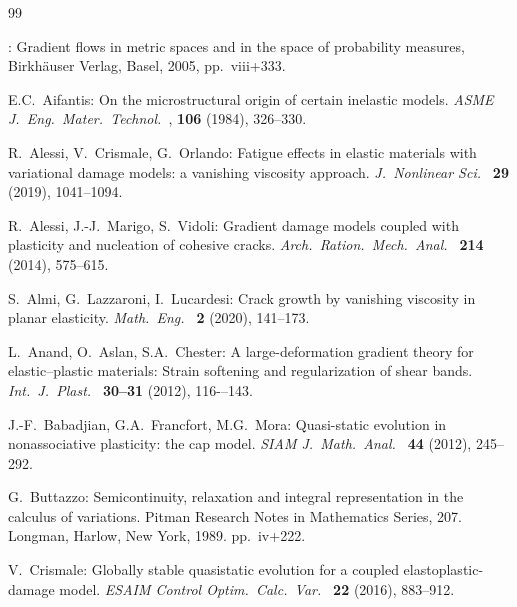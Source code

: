 \documentclass[reqno]{amsart}
\theoremstyle{definition}
\numberwithin{equation}{section}
\begin{document}
\begin{thebibliography}{99}

:
\newblock Gradient flows in metric spaces and in the space of probability measures,
\newblock Birkhäuser Verlag, Basel, 2005, pp.~viii+333.

{\sc E.C.~Aifantis}: 
On the microstructural origin of certain inelastic models. 
{\it ASME J.\ Eng.\ Mater.\ Technol.\ }, {\bf 106} (1984), 326--330.


{\sc R.~Alessi, V.~Crismale, G.~Orlando}:
Fatigue effects in elastic materials with variational damage models: a vanishing viscosity approach.
{\it J.\ Nonlinear Sci.\ } {\bf 29} (2019), 1041--1094.

{\sc R.~Alessi, J.-J.~Marigo, S.~Vidoli}: 
Gradient damage models coupled with plasticity and nucleation of cohesive cracks. 
{\it Arch.\ Ration.\ Mech.\ Anal.\ } {\bf 214} (2014), 575--615.

{\sc S.~Almi, G.~Lazzaroni, I.~Lucardesi}: 
Crack growth by vanishing viscosity in planar elasticity. 
{\it Math.\ Eng.\ } {\bf 2} (2020), 141--173.


{\sc L.~Anand, O.~Aslan, S.A.~Chester}: 
A large-deformation gradient theory for elastic–plastic materials: Strain softening and regularization of shear bands. 
{\it Int.\ J.\ Plast.\ } {\bf 30–31} (2012), 116-–143.

{\sc J.-F.~Babadjian, G.A.~Francfort, M.G.~Mora}:
Quasi-static evolution in nonassociative plasticity: the cap model.
{\it SIAM J.\ Math.\ Anal.\ } {\bf 44} (2012), 245--292.

{\sc G.~Buttazzo}: 
Semicontinuity, relaxation and integral representation in the calculus of variations. 
Pitman Research Notes in Mathematics Series, 207. Longman, Harlow, New York, 1989. pp.~iv+222.

{\sc V.~Crismale}: 
Globally stable quasistatic evolution for a coupled elastoplastic-damage model. 
{\it ESAIM Control Optim.\ Calc.\ Var.\ } {\bf 22} (2016), 883--912.


\end{thebibliography}
\end{document}
